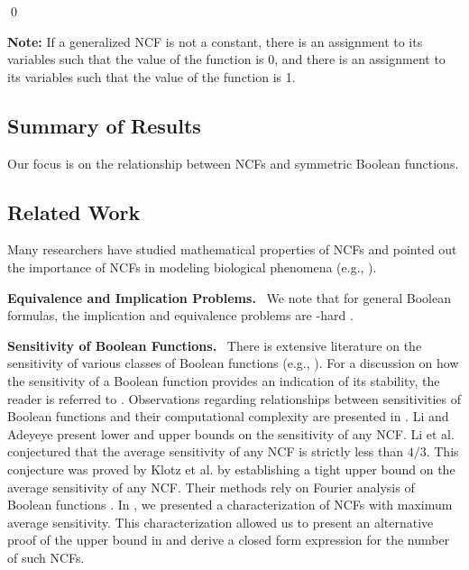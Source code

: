 \noindent
\qed

\bigskip

\noindent
\textbf{Note:} If a generalized NCF is not a constant, 
there is an assignment to its variables
such that the value of the function is 0,
and there is an assignment to its variables
such that the value of the function is 1.




\subsection{Summary of Results}
\label{sse:contrib}

Our focus is on the relationship between NCFs and symmetric
Boolean functions.


\subsection{Related Work}


Many researchers have studied mathematical properties of NCFs and
pointed out the importance of NCFs in modeling biological
phenomena (e.g., \cite{Kauffman-etal-2003,Kauffman-etal-2004,Layne-2011,
Layne-etal-2012,Li-etal-2011,Li-etal-2012,Li-etal-2013}).

\medskip

\noindent
\textbf{Equivalence and Implication Problems.}~
We note that for general Boolean formulas, the implication and equivalence problems
are \cnp-hard \cite{GJ-1979}.

\bigskip

\noindent
\textbf{Sensitivity of Boolean Functions.}~
There is extensive literature on the sensitivity of various classes
of Boolean functions
(e.g., \cite{Buhrman-etal-2002,Nisan-etal-1994,Zhang-2011}).
For a discussion on how the sensitivity of a Boolean function provides
an indication of its stability, the reader is referred to \cite{Kauffman-etal-2004,
Layne-2011,Layne-etal-2012}.
Observations regarding relationships between sensitivities of Boolean functions
and their computational complexity are presented
in \cite{Buhrman-etal-2002,Nisan-etal-1994}.
Li and Adeyeye \cite{Li-etal-2012} present lower and upper bounds on the
sensitivity of any NCF.
Li et al. \cite{Li-etal-2011,Li-etal-2013} conjectured that the average
sensitivity of any NCF is strictly less than  $4/3$.
This conjecture was proved by Klotz et al. \cite{Klotz-etal-2013} by establishing
a tight upper bound on the average sensitivity of any NCF.
Their methods rely on Fourier analysis of Boolean functions
\cite{Odonnell-2014}.
In \cite{Stearns-etal-2018}, 
we presented a characterization of NCFs with maximum average sensitivity.
This characterization allowed us to present an alternative proof 
of the upper bound in \cite{Klotz-etal-2013} and derive a closed
form expression for the number of such NCFs.
